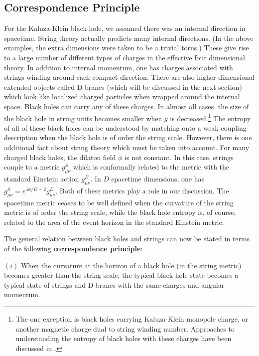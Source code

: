 \documentclass[12pt]{article}
\begin{document}
\subsection{Correspondence Principle}

For the Kaluza-Klein black hole,
we assumed there was an internal direction in spacetime. String theory
actually predicts many internal directions. (In the above
examples, the extra dimensions were taken to be a trivial torus.)
These give rise to a large number of different types of charges 
in the effective four dimensional theory. In addition to internal momentum,
one has charges associated with strings winding around each compact direction.
There are also higher dimensional extended objects called D-branes
(which will be discussed in the next section) which look like localized
charged particles when wrapped around the internal space. Black holes
can carry any of these charges. In almost all cases, the size of the
black hole in string units becomes smaller when $g$ is decreased.\footnote{The
one exception is black holes carrying Kaluza-Klein monopole charge, or
another magnetic charge dual to string winding  number.  Approaches to
understanding the entropy of black holes with these charges have been discussed
in \cite{lawi,cvts,dvv1}.} 
The entropy of all of these black holes can be understood
by matching onto a weak coupling description when the black hole is of
order the string scale. However, there is one additional fact about
string theory which must be taken into account.
For many charged black holes, the dilaton field $\phi$ is not
constant. In this case, strings couple to a metric $g_{\mu\nu}^S$ which
is  conformally related to the metric with the standard Einstein action 
$g_{\mu\nu}^E$. In $D$ spacetime dimensions, one has 
$g_{\mu\nu}^S = e^{4\phi/D-2} g_{\mu\nu}^E$. 
Both of these metrics play a role in our discussion.
The spacetime metric ceases to be well defined when the curvature of the string
metric is of order the string scale, while the black hole entropy
is, of course, related to the area of the event horizon in the standard
Einstein metric. 

The general relation between black holes and strings
can now be stated in terms of the following {\bf correspondence principle}:

$(i)$ When the curvature at the horizon of a black hole (in the string
metric) becomes greater than
the string scale,  the typical black hole state becomes a typical state
of strings and D-branes with the same charges and angular momentum.
\end{document}
